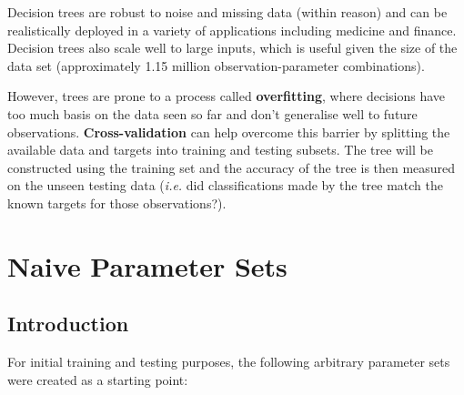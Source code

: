 Decision trees are robust to noise and missing data (within reason) and can be
realistically deployed in a variety of applications including medicine and
finance. Decision trees also scale well to large inputs, which is useful given
the size of the data set (approximately 1.15 million observation-parameter
combinations).

However, trees are prone to a process called \textbf{overfitting}, where
decisions have too much basis on the data seen so far and don't generalise well
to future observations. \textbf{Cross-validation} can help overcome this barrier
by splitting the available data and targets into training and testing subsets.
The tree will be constructed using the training set and the accuracy of the tree
is then measured on the unseen testing data (\textit{i.e.} did classifications
made by the tree match the known targets for those observations?)\citep{sl:trees}.


\section{Naive Parameter Sets}
\subsection{Introduction}

For initial training and testing purposes, the following arbitrary parameter
sets were created as a starting point:

